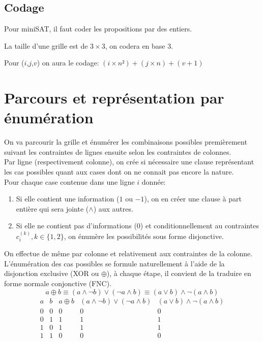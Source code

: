 \documentclass[a4paper,12pt]{report}
\begin{document}
\subsection{Codage}
Pour miniSAT, il faut coder les propositions par des entiers.


La taille d'une grille est de $3\times3$, on codera en base 3.


Pour ($i$,$j$,$v$) on aura le codage: $(i \times n²)+(j \times n)+(v+1)$


\section{Parcours et représentation par énumération}


On va parcourir la grille et énumérer les combinaisons possibles premièrement suivant les contraintes de lignes ensuite selon les contraintes de colonnes.\\ 

Par ligne (respectivement colonne), on crée si nécessaire une clause représentant les cas possibles quant aux cases dont on ne connait pas encore la nature.\\

Pour chaque case contenue dans une ligne $i$ donnée:
\begin{enumerate}
\item Si elle contient une information ($1$ ou $-1$), on en créer une clause à part entière qui sera jointe ($\wedge$) aux autres.
\item Si elle ne contient pas d'informations ($0$) et conditionnellement au contraintes $c_i^{(k)}, k\in\{1,2\}$, on énumère les possibilités sous forme disjonctive.
\end{enumerate}
On effectue de même par colonne et relativement aux contraintes de la colonne.\\

L'énumération des cas possibles se formule naturellement à l'aide de la disjonction exclusive (XOR ou $\oplus$), à chaque étape, il convient de la traduire en forme normale conjonctive (FNC).
$$ a\oplus b \equiv (a \wedge \lnot b)\vee(\lnot a \wedge b) \equiv (a\vee b)\wedge\lnot(a\wedge b)$$
\begin{displaymath}
\begin{array}{c|c|c|c|c}
   a
 & b
 & a \oplus b
 & (a\land{}\lnot{}b)\lor{}(\lnot{}a\land{}b)
  & (a\lor{}b)\land{}\lnot{}(a\land{}b) \\
\hline
0 & 0 & 0 & 0 & 0 \\
0 & 1 & 1 & 1 & 1 \\
1 & 0 & 1 & 1 & 1 \\
1 & 1 & 0 & 0 & 0 \\

\end{array}
\end{displaymath}
\end{document}
